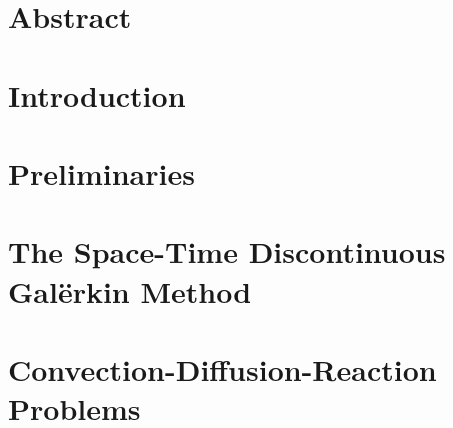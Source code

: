 \documentclass[12pt, oneside]{book}
\begin{document}

	


    \newpage

    


    \chapter*{Abstract}
    
    


    \newpage
    \tableofcontents
    \thispagestyle{plain}



    \newpage
    \chapter*{Introduction}
     \label{chapter:introduction}


    


    \newpage
    \chapter{Preliminaries} \label{chapter:preliminaries}

    


    \newpage
    \chapter{The Space-Time Discontinuous Galërkin Method} \label{chapter:dg}

    


    \newpage
    \chapter{Convection-Diffusion-Reaction Problems} \label{chapter:cdr}
\end{document}
